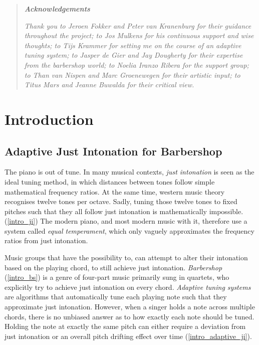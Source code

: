 \documentclass[a4paper]{article}
\begin{document}
\begin{titlepage}
\begin{quotation}
	\begin{center}
		\textbf{\textit{Acknowledgements}}
	\end{center}
	{\small \it Thank you to Jeroen Fokker and Peter van Kranenburg for their guidance throughout the project; to Jos Mulkens for his continuous support and wise thoughts; to Tijs Krammer for setting me on the course of an adaptive tuning system; to Jasper de Gier and Jay Dougherty for their expertise from the barbershop world; to Noelia Iranzo Ribera for the support group; to Than van Nispen and Marc Groenewegen for their artistic input; to Titus Mars and Jeanne Buwalda for their critical view.}
\end{quotation}

\end{titlepage}

\newgeometry{} %

\tableofcontents

\newpage

\section{Introduction}
\subsection{Adaptive Just Intonation for Barbershop}
The piano is out of tune. In many musical contexts, \textit{just intonation} is seen as the ideal tuning method, in which distances between tones follow simple mathematical frequency ratios. \cite{boyden_prelleur_1951, fonville_ben_1991} At the same time, western music theory recognises twelve tones per octave. \cite{persichetti_twentieth-century_1961} Sadly, tuning those twelve tones to fixed pitches such that they all follow just intonation is mathematically impossible. (\ref{intro_ji}) The modern piano, and most modern music with it, therefore use a system called \textit{equal temperament}, which only vaguely approximates the frequency ratios from just intonation. \cite{van_de_craats_fis_1989}

Music groups that have the possibility to, can attempt to alter their intonation based on the playing chord, to still achieve just intonation. \textit{Barbershop} (\ref{intro_bs}) is a genre of four-part music primarily sung in quartets, who explicitly try to achieve just intonation on every chord. \cite{barbershop_harmony_society_contest_2022, averill_bell_1999} \textit{Adaptive tuning systems} are algorithms that automatically tune each playing note such that they approximate just intonation. \cite{sethares_adaptive_1994} However, when a singer holds a note across multiple chords, there is no unbiased answer as to how exactly each note should be tuned. Holding the note at exactly the same pitch can either require a deviation from just intonation or an overall pitch drifting effect over time (\ref{intro_adaptive_ji}).
\end{document}

